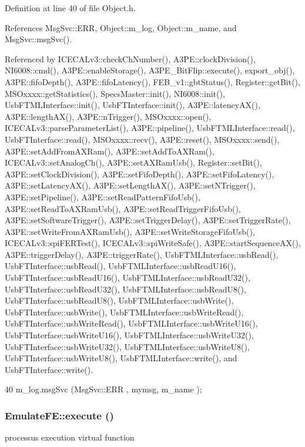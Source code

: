 Definition at line 40 of file Object.h.

References MsgSvc::ERR, Object::m\_\-log, Object::m\_\-name, and MsgSvc::msgSvc().

Referenced by ICECALv3::checkChNumber(), A3PE::clockDivision(), NI6008::cmd(), A3PE::enableStorage(), A3PE\_\-BitFlip::execute(), export\_\-obj(), A3PE::fifoDepth(), A3PE::fifoLatency(), FEB\_\-v1::gbtStatus(), Register::getBit(), MSOxxxx::getStatistics(), SpecsMaster::init(), NI6008::init(), UsbFTMLInterface::init(), UsbFTInterface::init(), A3PE::latencyAX(), A3PE::lengthAX(), A3PE::nTrigger(), MSOxxxx::open(), ICECALv3::parseParameterList(), A3PE::pipeline(), UsbFTMLInterface::read(), UsbFTInterface::read(), MSOxxxx::recv(), A3PE::reset(), MSOxxxx::send(), A3PE::setAddFromAXRam(), A3PE::setAddToAXRam(), ICECALv3::setAnalogCh(), A3PE::setAXRamUsb(), Register::setBit(), A3PE::setClockDivision(), A3PE::setFifoDepth(), A3PE::setFifoLatency(), A3PE::setLatencyAX(), A3PE::setLengthAX(), A3PE::setNTrigger(), A3PE::setPipeline(), A3PE::setReadPatternFifoUsb(), A3PE::setReadToAXRamUsb(), A3PE::setReadTriggerFifoUsb(), A3PE::setSoftwareTrigger(), A3PE::setTriggerDelay(), A3PE::setTriggerRate(), A3PE::setWriteFromAXRamUsb(), A3PE::setWriteStorageFifoUsb(), ICECALv3::spiFERTest(), ICECALv3::spiWriteSafe(), A3PE::startSequenceAX(), A3PE::triggerDelay(), A3PE::triggerRate(), UsbFTMLInterface::usbRead(), UsbFTInterface::usbRead(), UsbFTMLInterface::usbReadU16(), UsbFTInterface::usbReadU16(), UsbFTMLInterface::usbReadU32(), UsbFTInterface::usbReadU32(), UsbFTMLInterface::usbReadU8(), UsbFTInterface::usbReadU8(), UsbFTMLInterface::usbWrite(), UsbFTInterface::usbWrite(), UsbFTMLInterface::usbWriteRead(), UsbFTInterface::usbWriteRead(), UsbFTMLInterface::usbWriteU16(), UsbFTInterface::usbWriteU16(), UsbFTMLInterface::usbWriteU32(), UsbFTInterface::usbWriteU32(), UsbFTMLInterface::usbWriteU8(), UsbFTInterface::usbWriteU8(), UsbFTMLInterface::write(), and UsbFTInterface::write().


\begin{DoxyCode}
40 { m_log.msgSvc (MsgSvc::ERR     , mymsg, m_name ); }
\end{DoxyCode}
\hypertarget{classEmulateFE_a5133d5b45521fc311db62d61217848b9}{
\subsubsection[{execute}]{ EmulateFE::execute ()}}
\label{classEmulateFE_a5133d5b45521fc311db62d61217848b9}
processus execution virtual function 

